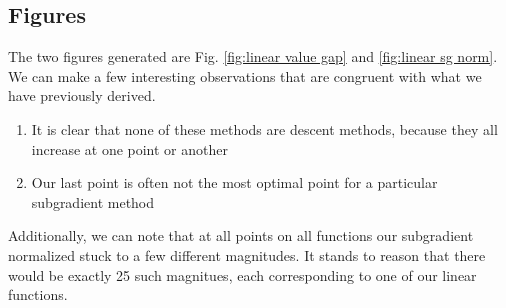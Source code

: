 \documentclass[journal,onecolumn]{IEEEtran}
\begin{document}
\subsection{Figures}
The two figures generated are Fig. \ref{fig:linear value gap} and \ref{fig:linear sg norm}. We can make a few interesting observations that are congruent with what we have previously derived.
\begin{enumerate}
    \item It is clear that none of these methods are descent methods, because they all increase at one point or another
    \item Our last point is often not the most optimal point for a particular subgradient method
\end{enumerate}
Additionally, we can note that at all points on all functions our subgradient normalized stuck to a few different magnitudes. It stands to reason that there would be exactly 25 such magnitues, each corresponding to one of our linear functions.
\end{document}
